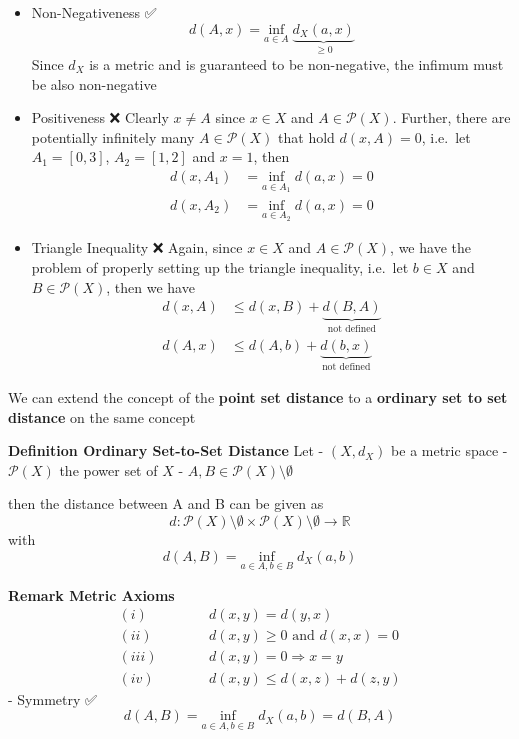 \documentclass[
]{article}
\begin{document}
\begin{itemize}
\item
  Non-Negativeness ✅
  \[d(A,x)=\underset{a \in A}{\text{inf}}\; \underbrace{ d_{X}(a,x) }_{ \geq 0 }\]
  Since \(d_{X}\) is a metric and is guaranteed to be non-negative, the
  infimum must be also non-negative
\item
  Positiveness ❌ Clearly \(x \neq A\) since \(x \in X\) and
  \(A \in \mathcal{P}(X)\). Further, there are potentially infinitely
  many \(A \in \mathcal{P}(X)\) that hold \(d(x,A) = 0\), i.e.~let
  \(A_{1}=[0,3]\), \(A_{2}=[1,2]\) and \(x=1\), then \[\begin{align}
  d(x,A_{1}) &= \underset{a \in A_{1}}{\text{inf}}\; d(a,x) = 0 \\ 
  d(x,A_{2}) &= \underset{a \in A_{2}}{\text{inf}}\; d(a,x) = 0
  \end{align}\]
\item
  Triangle Inequality ❌ Again, since \(x \in X\) and
  \(A \in \mathcal{\mathcal{P}}(X)\), we have the problem of properly
  setting up the triangle inequality, i.e.~let \(b \in X\) and
  \(B \in \mathcal{P}(X)\), then we have \[\begin{align}
  d(x,A) &\leq d(x,B) + \underbrace{ d(B,A) }_{ \text{not defined} } \\
  d(A,x) &\leq d(A,b) + \underbrace{ d(b,x) }_{ \text{not defined} } 
  \end{align}\]
\end{itemize}

We can extend the concept of the \textbf{point set distance} to a
\textbf{ordinary set to set distance} on the same concept

\textbf{Definition Ordinary Set-to-Set Distance} Let - \((X,d_{X})\) be
a metric space - \(\mathcal{P}(X)\) the power set of \(X\) -
\(A,B \in \mathcal{P}(X)\setminus \emptyset\)

then the distance between A and B can be given as
\[d: \mathcal{P}(X)\setminus \emptyset \times \mathcal{P}(X)\setminus \emptyset \to \mathbb{R}\]
with \[d(A,B) = \underset{a \in A, b \in B}{\text{inf}}\; d_{X}(a,b)\]

\textbf{Remark Metric Axioms} \[\begin{alignat}{2}
(i)& \quad&&d(x,y) = d(y,x) \tag{Symmetry} \\
(ii)& \;\quad&&d(x,y) \geq 0 \text{ and } d(x,x)=0 \tag{Non-Negativeness} \\
(iii)& \quad &&d(x,y)=0 \Rightarrow x=y \tag{Positiveness} \\ 
(iv)& \quad &&d(x,y) \leq d(x,z) + d(z,y) \tag{Triangle Inequality}
\end{alignat}\] - Symmetry ✅
\[d(A,B)=\underset{a \in A, b \in B}{\text{inf}}\; d_{X}(a,b)= d(B,A)\]
\end{document}
